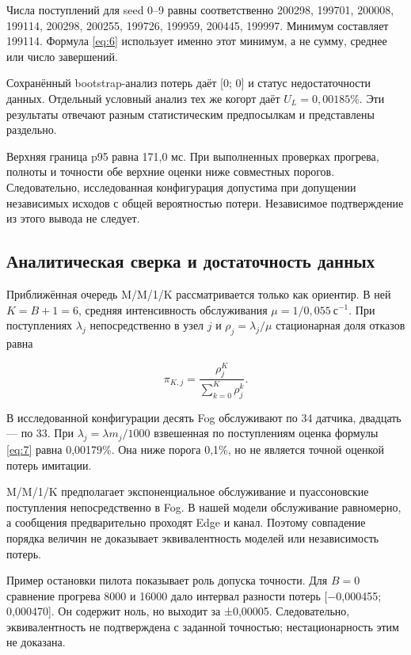 Числа поступлений для seed 0--9 равны соответственно 200298, 199701, 200008, 199114, 200298, 200255, 199726, 199959, 200445, 199997. Минимум составляет 199114. Формула \eqref{eq:6} использует именно этот минимум, а не сумму, среднее или число завершений.

Сохранённый bootstrap-анализ потерь даёт {[}0; 0{]} и статус недостаточности данных. Отдельный условный анализ тех же когорт даёт \(U_L=0{,}00185\%\). Эти результаты отвечают разным статистическим предпосылкам и представлены раздельно.

Верхняя граница p95 равна 171,0 мс. При выполненных проверках прогрева, полноты и точности обе верхние оценки ниже совместных порогов. Следовательно, исследованная конфигурация допустима при допущении независимых исходов с общей вероятностью потери. Независимое подтверждение из этого вывода не следует.

\hypertarget{ux430ux43dux430ux43bux438ux442ux438ux447ux435ux441ux43aux430ux44f-ux441ux432ux435ux440ux43aux430-ux438-ux434ux43eux441ux442ux430ux442ux43eux447ux43dux43eux441ux442ux44c-ux434ux430ux43dux43dux44bux445}{%
\subsection{Аналитическая сверка и достаточность данных}}

Приближённая очередь M/M/1/K рассматривается только как ориентир. В ней \(K=B+1=6\), средняя интенсивность обслуживания \(\mu=1/0{,}055\ \text{с}^{-1}\). При поступлениях \(\lambda_j\) непосредственно в узел \(j\) и \(\rho_j=\lambda_j/\mu\) стационарная доля отказов равна

\begin{equation}\label{eq:7}
\pi_{K,j}=\frac{\rho_j^K}{\displaystyle\sum_{k=0}^{K}\rho_j^k}.
\end{equation}

В исследованной конфигурации десять Fog обслуживают по 34 датчика, двадцать --- по 33. При \(\lambda_j=\lambda m_j/1000\) взвешенная по поступлениям оценка формулы \eqref{eq:7} равна 0,00179\%. Она ниже порога 0,1\%, но не является точной оценкой потерь имитации.

M/M/1/K предполагает экспоненциальное обслуживание и пуассоновские поступления непосредственно в Fog. В нашей модели обслуживание равномерно, а сообщения предварительно проходят Edge и канал. Поэтому совпадение порядка величин не доказывает эквивалентность моделей или независимость потерь.

Пример остановки пилота показывает роль допуска точности. Для \(B=0\) сравнение прогрева 8000 и 16000 дало интервал разности потерь {[}−0,000455; 0,000470{]}. Он содержит ноль, но выходит за ±0,00005. Следовательно, эквивалентность не подтверждена с заданной точностью; нестационарность этим не доказана.

